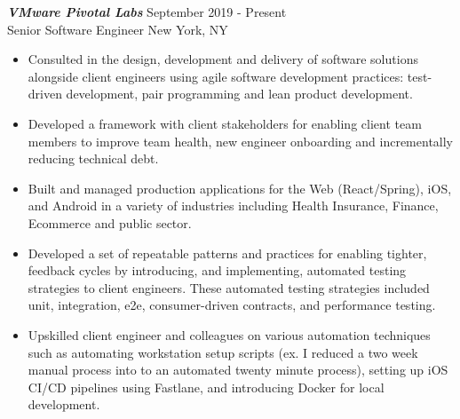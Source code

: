 {\sl \textbf{VMware Pivotal Labs}} \hfill September 2019 - Present \\ Senior Software Engineer \hfill New York, NY
\begin{itemize}
    \item Consulted in the design, development and delivery of software solutions alongside client engineers using agile software development practices: test-driven development, pair programming and lean product development.
    \item Developed a framework with client stakeholders for enabling client team members to improve team health, new engineer onboarding and incrementally reducing technical debt.
    \item Built and managed production applications for the Web (React/Spring), iOS, and Android in a variety of industries including Health Insurance, Finance, Ecommerce and public sector.
    \item Developed a set of repeatable patterns and practices for enabling tighter, feedback cycles by introducing, and implementing, automated testing strategies to client engineers. These automated testing strategies included unit, integration, e2e, consumer-driven contracts, and performance testing.
    \item Upskilled client engineer and colleagues on various automation techniques such as automating workstation setup scripts (ex. I reduced a two week manual process into to an automated twenty minute process), setting up iOS CI/CD pipelines using Fastlane, and introducing Docker for local development.
\end{itemize}
